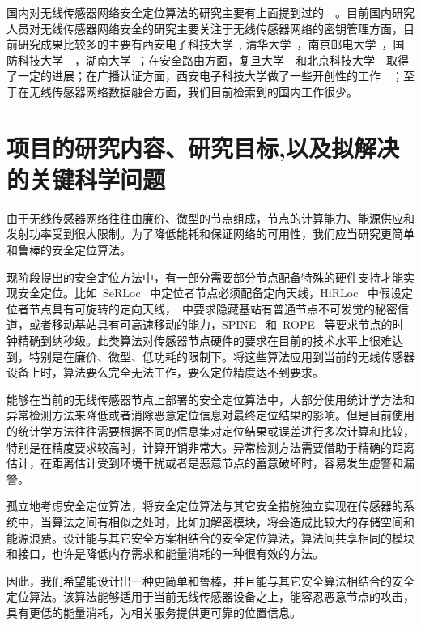 \documentclass[a4paper,10pt]{article}
\begin{document}
国内对无线传感器网络安全定位算法的研究主要有上面提到过的~\cite{Chen2008, Ma2008, Cao2008}~。目前国内研究人员对无线传感器网络安全的研究主要关注于无线传感器网络的密钥管理方面，目前研究成果比较多的主要有西安电子科技大学~\cite{Feng2008a, Pei2007, Li2008, Liu2006, Feng2008b}, 清华大学~\cite{Su2009, Su2007}，南京邮电大学~\cite{Yang2008, Yang2007, Li2006, Huang2006}，国防科技大学~\cite{Li2008a, Xia2008}~，湖南大学~\cite{Cai2008, Zeng2007, Li2006a}；在安全路由方面，复旦大学~\cite{Yu2006}~和北京科技大学~\cite{Zhou2007a}~取得了一定的进展；在广播认证方面，西安电子科技大学做了一些开创性的工作~\cite{Shen2007}~；至于在无线传感器网络数据融合方面，我们目前检索到的国内工作很少。

\section{项目的研究内容、研究目标,以及拟解决的关键科学问题} 

由于无线传感器网络往往由廉价、微型的节点组成，节点的计算能力、能源供应和发射功率受到很大限制。为了降低能耗和保证网络的可用性，我们应当研究更简单和鲁棒的安全定位算法。

现阶段提出的安全定位方法中，有一部分需要部分节点配备特殊的硬件支持才能实现安全定位。比如~SeRLoc \cite{Lazos2005}~中定位者节点必须配备定向天线，HiRLoc \cite{Lazos2005a}~中假设定位者节点具有可旋转的定向天线，\cite{Capkun2006a, Capkun2008}~中要求隐藏基站有普通节点不可发觉的秘密信道，或者移动基站具有可高速移动的能力，SPINE \cite{Capkun2006}~和~ROPE \cite{Lazos2006}~等要求节点的时钟精确到纳秒级。此类算法对传感器节点硬件的要求在目前的技术水平上很难达到，特别是在廉价、微型、低功耗的限制下。将这些算法应用到当前的无线传感器设备上时，算法要么完全无法工作，要么定位精度达不到要求。

能够在当前的无线传感器节点上部署的安全定位算法中，大部分使用统计学方法和异常检测方法来降低或者消除恶意定位信息对最终定位结果的影响。但是目前使用的统计学方法往往需要根据不同的信息集对定位结果或误差进行多次计算和比较，特别是在精度要求较高时，计算开销非常大。异常检测方法需要借助于精确的距离估计，在距离估计受到环境干扰或者是恶意节点的蓄意破坏时，容易发生虚警和漏警。

孤立地考虑安全定位算法，将安全定位算法与其它安全措施独立实现在传感器的系统中，当算法之间有相似之处时，比如加解密模块，将会造成比较大的存储空间和能源浪费。设计能与其它安全方案相结合的安全定位算法，算法间共享相同的模块和接口，也许是降低内存需求和能量消耗的一种很有效的方法。

因此，我们希望能设计出一种更简单和鲁棒，并且能与其它安全算法相结合的安全定位算法。该算法能够适用于当前无线传感器设备之上，能容忍恶意节点的攻击，具有更低的能量消耗，为相关服务提供更可靠的位置信息。
\end{document}
